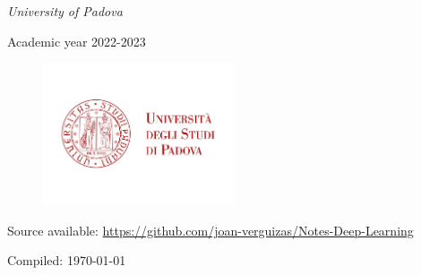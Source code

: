 \begin{titlepage}
	\textit{University of Padova } %
	
	\vspace{0.5\baselineskip}
	
	\small Academic year 2022-2023
	
	\vspace{1cm}


    \begin{figure}[H]
        \centering
        \includegraphics[width=0.5\textwidth]{Images/logo_unipd.jpg}
        \label{fig:example}
    \end{figure}

 
	
	Source available: \url{https://github.com/joan-verguizas/Notes-Deep-Learning}
	\vspace{1cm}
	
	\footnotesize Compiled: \today %
	
	\vfill %
	
%	
%	
%	
%	

\end{titlepage}

\clearpage{\pagestyle{empty}\cleardoublepage}
